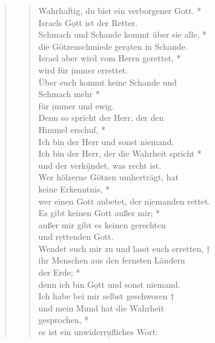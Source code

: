 \vspace{0.3cm}

\def\greinitialformat#1{{\fontsize{40}{40}\selectfont #1}}
\gresetfirstlineaboveinitial{\small \textcolor{red}{Is 45}}{}
\setaboveinitialseparation{0.72mm}


\begin{quote}
\begin{verse}
Wahrhaftig, du bist ein verborgener Gott. *\\
Israels G\d ott ist der Retter.\\
\vin Schmach und Schande kommt über sie alle, *\\
\vin die Götzenschmiede ger\d aten in Schande.\\
Israel aber wird vom Herrn gerettet, *\\
wird für \d immer errettet. \\
\vin Über euch kommt keine Schande und\\ \vin  Schmach mehr *\\ 
\vin für \d immer und ewig.\\
Denn so spricht der Herr, der den\\ Himmel erschuf, *\\
Ich bin der Herr und sonst niemand. \\
\vin Ich bin der Herr, der die Wahrheit spricht *\\ \vin und der verk\d ündet, was recht ist. \\
Wer hölzerne Götzen umherträgt, hat\\ keine Erkenntnis, *\\ wer einen Gott anbetet, der n\d iemanden rettet. \\
\vin Es gibt keinen Gott außer mir; *\\
 \vin außer mir gibt es keinen gerechten\\ \vin  und r\d ettenden Gott.\\
Wendet euch mir zu und lasst euch erretten, †\\
ihr Menschen aus den fernsten Ländern\\ der Erde; *\\ denn ich bin G\d ott und sonst niemand.\\
\vin Ich habe bei mir selbst geschworen †\\
\vin und mein Mund hat die Wahrheit\\ \vin gesprochen, *\\ \vin es ist ein unwiderr\d ufliches Wort: \\

\end{verse}
\end{quote}
